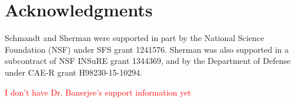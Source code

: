 \section{Acknowledgments}


Schmandt and Sherman were supported in part by the National Science Foundation (NSF) under SFS grant 1241576. Sherman was also supported in a subcontract of NSF INSuRE grant 1344369, and by the Department of Defense under CAE-R grant H98230-15-10294.

\textcolor{red}{I don't have Dr. Banerjee's support information yet}